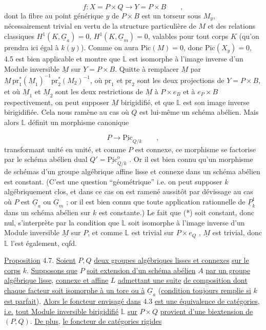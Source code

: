 \begin{equation*}
f : X = P \times Q \longrightarrow Y = P \times B \qquad ,
\end{equation*}
dont la fibre au point générique $y$ de $P \times B$ est un torseur sous $M_y$, nécessairement trivial en vertu de la structure particulière de $M$ et des relations classiques $H^1(K,\underline{G}_a) = 0$, $H^1(K,\underline{G}_m) = 0$, valables pour tout corps $K$ (qu'on prendra ici égal à $k(y)$). Comme on aura $\mathrm{Pic}(M) = 0$, donc $\mathrm{Pic}(X_y) = 0$, 4.5 est bien applicable et montre que $\mathbb{L}$ est isomorphe à l'image inverse d'un Module inversible $\underline{M}$ sur $Y = P \times B$. Quitte à remplacer $\underline{M}$ par $\underline{M}\,\mathrm{pr}_1^*(\underline{M}_1)^{-1}\mathrm{pr}_2^*(M_2)^{-1}$, où $\mathrm{pr}_1$ et $\mathrm{pr}_2$ sont les deux projections de $Y=P \times B$, et où $\underline{M}_1$ et $\underline{M}_2$ sont les deux restrictions de $\underline{M}$ à $P \times e_B$ et à $e_P \times B$ respectivement, on peut supposer $\underline{M}$ birigidifié, et que $\mathbb{L}$ est son image inverse birigidifiée. Cela nous ramène au cas où $Q$ est lui-même un schéma abélien. Mais alors $\mathbb{L}$ définit un morphisme canonique

\begin{equation}\tag{*}
P \longrightarrow \underline{\mathrm{Pic}}_{Q/k} \qquad ,
\end{equation}
transformant unité en unité, et comme $P$ est connexe, ce morphisme se
factorise par le schéma abélien dual $Q' = \underline{\mathrm{Pic}}^{\mathrm{o}}_{Q/k}$ . Or il est bien connu qu'un morphisme de schémas d'un groupe algébrique affine lisse et connexe dans un schéma abélien est constant. (C'est une question ``géométrique'' i.e. on peut supposer $k$ algébriquement clos, et dans ce cas on est ramené aussitôt par dévissage au cas où $P$ est $\underline{G}_a$ ou $\underline{G}_m$ ; or il est bien connu que toute application rationnelle de $\underline{P}^1_k$ dans un schéma abélien sur $k$ est constante.) Le fait que (*) soit constant, donc nul, s'interprète par la condition que $\mathbb{L}$ soit isomorphe à l'image inverse d'un Module inversible $\underline{M}$ sur $P$, et comme $\mathbb{L}$ est trivial sur $P \times e_Q$ , $\underline{M}$ est trivial, donc $\mathbb{L}$ l'est également, cqfd.

\underline{Proposition} 4.7. \underline{Soient} $P,Q$ \underline{deux groupes algébriques lisses et connexes} \underline{sur le corps} $k$. \underline{Supposons que} $P$ \underline{soit extension d'un schéma abélien} $A$ \underline{par un groupe algébrique lisse}, \underline{connexe et affine} $L$ \underline{admettant une suite} \underline{de composition dont chaque facteur soit isomorphe à un tore ou à} $\underline{G}_a$ (\underline{condition toujours remplie si} $k$ \underline{est parfait}). \underline{Alors le foncteur envisagé dans} 4.3 \underline{est une équivalence de catégories}, \underline{i.e.} \underline{tout Module inversible birigidifié} $\mathbb{L}$ \underline{sur} $P \times Q$ \underline{provient d'une biextension de} $(P,Q)$. \underline{De plus}, \underline{le foncteur de catégories rigides}


